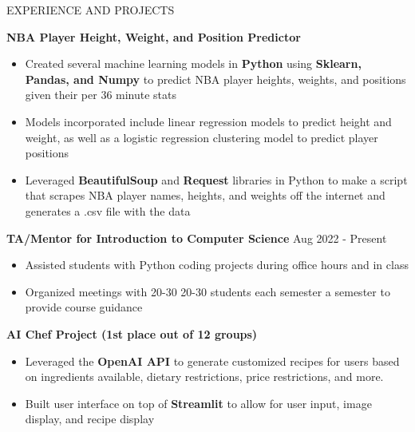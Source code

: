 \documentclass{resume} %
\begin{document}
\begin{rSection}{EXPERIENCE AND PROJECTS}


\item \textbf{NBA Player Height, Weight, and Position Predictor} %
\vspace{-6pt}
 \begin{itemize}
    \itemsep -6pt {} 
     \item Created several machine learning models in \textbf{Python} using \textbf{Sklearn, Pandas, and Numpy} to predict NBA player heights, weights, and positions given their per 36 minute stats
     \item Models incorporated include linear regression models to predict height and weight, as well as a logistic regression clustering model to predict player positions
    \item Leveraged \textbf{BeautifulSoup} and \textbf{Request} libraries in Python to make a script that scrapes NBA player names, heights, and weights off the internet and generates a .csv file with the data
 \end{itemize}



 \textbf{TA/Mentor for Introduction to Computer Science} \hfill Aug 2022 - Present%
\vspace{-6pt}
 \begin{itemize}
    \itemsep -6pt {} 
     \item Assisted students with Python coding projects during office hours and in class
     \item Organized meetings with 20-30 20-30 students each semester a semester to provide course guidance
 \end{itemize}

 \textbf{AI Chef Project (1st place out of 12 groups)} \hfill %
\vspace{-6pt}
 \begin{itemize}
    \itemsep -6pt {} 
     \item Leveraged the \textbf{OpenAI API} to generate customized recipes for users based on ingredients available, dietary restrictions, price restrictions, and more.
     \item Built user interface on top of \textbf{Streamlit} to allow for user input, image display, and recipe display
 \end{itemize}
 

\end{rSection}
\end{document}
